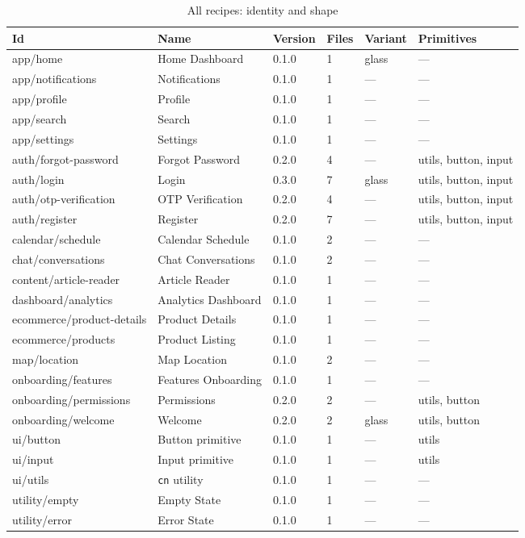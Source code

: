 \begin{longtable}{p{3.6cm}p{5.4cm}p{1.5cm}p{1.1cm}p{1.5cm}p{2.1cm}}
\caption{All recipes: identity and shape}\\
\toprule
\textbf{Id} & \textbf{Name} & \textbf{Version} & \textbf{Files} & \textbf{Variant} &
\textbf{Primitives} \\
\midrule

app/home & Home Dashboard & 0.1.0 & 1 & glass & --- \\
app/notifications & Notifications & 0.1.0 & 1 & --- & --- \\
app/profile & Profile & 0.1.0 & 1 & --- & --- \\
app/search & Search & 0.1.0 & 1 & --- & --- \\
app/settings & Settings & 0.1.0 & 1 & --- & --- \\
auth/forgot-password & Forgot Password & 0.2.0 & 4 & --- & utils, button, input \\
auth/login & Login & 0.3.0 & 7 & glass & utils, button, input \\
auth/otp-verification & OTP Verification & 0.2.0 & 4 & --- & utils, button, input \\
auth/register & Register & 0.2.0 & 7 & --- & utils, button, input \\
calendar/schedule & Calendar Schedule & 0.1.0 & 2 & --- & --- \\
chat/conversations & Chat Conversations & 0.1.0 & 2 & --- & --- \\
content/article-reader & Article Reader & 0.1.0 & 1 & --- & --- \\
dashboard/analytics & Analytics Dashboard & 0.1.0 & 1 & --- & --- \\
ecommerce/product-details & Product Details & 0.1.0 & 1 & --- & --- \\
ecommerce/products & Product Listing & 0.1.0 & 1 & --- & --- \\
map/location & Map Location & 0.1.0 & 2 & --- & --- \\
onboarding/features & Features Onboarding & 0.1.0 & 1 & --- & --- \\
onboarding/permissions & Permissions & 0.2.0 & 2 & --- & utils, button \\
onboarding/welcome & Welcome & 0.2.0 & 2 & glass & utils, button \\
ui/button & Button primitive & 0.1.0 & 1 & --- & utils \\
ui/input & Input primitive & 0.1.0 & 1 & --- & utils \\
ui/utils & \texttt{cn} utility & 0.1.0 & 1 & --- & --- \\
utility/empty & Empty State & 0.1.0 & 1 & --- & --- \\
utility/error & Error State & 0.1.0 & 1 & --- & --- \\
\bottomrule
\end{longtable}

